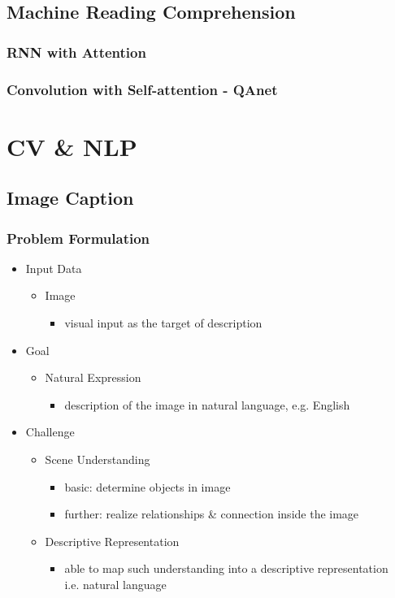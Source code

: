 \subsection{Machine Reading Comprehension}
\subsubsection{RNN with Attention}
\subsubsection{Convolution with Self-attention - QAnet}

\section{CV \& NLP}
\subsection{Image Caption}
\subsubsection{Problem Formulation}
\begin{itemize}
\item Input Data
	\begin{itemize}
	\item Image 
		\begin{itemize}
		\item visual input as the target of description
		\end{itemize}
	\end{itemize}
\item Goal
	\begin{itemize}
	\item Natural Expression
		\begin{itemize}
		\item description of the image in natural language, e.g. English
		\end{itemize}
	\end{itemize}
\item Challenge
	\begin{itemize}
	\item Scene Understanding
		\begin{itemize}
		\item basic: determine objects in image
		\item further: realize relationships \& connection inside the image
		\end{itemize}
	\item Descriptive Representation
		\begin{itemize}
		\item able to map such understanding into a descriptive representation \\
		i.e. natural language
		\end{itemize}
	\end{itemize}
\end{itemize}

